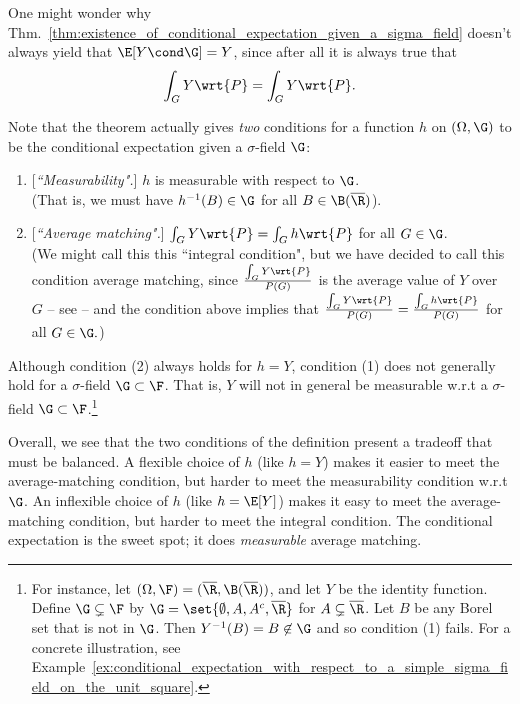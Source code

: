 \documentclass{article} %
\begin{document}
\begin{remark}
One might wonder why Thm.~\ref{thm:existence_of_conditional_expectation_given_a_sigma_field} doesn't always yield that $\E[Y \cond \G] = Y$, since after all it is always true that
\[  \int_G Y \wrt{P} = \int_G Y \wrt{P}.\]

Note that the theorem actually gives \textit{two} conditions for a function $h$ on $(\Omega, \G)$ to be the conditional expectation given a $\sigma$-field $\G$:
\begin{enumerate}
	\item {[}\textit{``Measurability".}]  $h$ is measurable with respect to $\G$.\\ 
	  
	 {\scriptsize (That is, we must have $h^{-1}(B) \in \G$ for all $B \in \B(\overline{\R})$).}
	\item {[}\textit{``Average matching".}] $\int_G Y \wrt{P} = \int_G h \wrt{P}$ for all $G \in \G$. \\
	
	{\scriptsize (We might call this this ``integral condition", but we have decided to call this condition average matching, since $\frac{\int_G Y \wrt{P}}{P(G)}$ is the average value of $Y$ over $G$ -- see  -- and the condition above implies that $\frac{\int_G Y \wrt{P}}{P(G)} = \frac{\int_G h \wrt{P}}{P(G)}$ for all $G \in \G.$)}
\end{enumerate}

Although condition (2) always holds for $h=Y$, condition (1) does not generally hold for a $\sigma$-field $\G \subset \F$. That is, $Y$ will not in general be measurable w.r.t a $\sigma$-field $\G \subset \F$.\footnote{For instance, let $(\Omega, \F) = (\overline{\R}, \B(\overline{\R}))$, and let $Y$ be the identity function.  Define $\G \subsetneq \F$ by $\G = \set{\emptyset, A, A^c, \overline{\R}}$ for $A \subsetneq \overline{\R}$.  Let $B$ be any Borel set that is not in $\G$.  Then $Y^{-1}(B) = B \not\in \G$ and so condition (1) fails.  For a concrete illustration, see Example~\ref{ex:conditional_expectation_with_respect_to_a_simple_sigma_field_on_the_unit_square}.}

Overall, we see that the two conditions of the definition present a tradeoff that must be balanced.  A flexible choice of $h$ (like $h=Y$) makes it easier to meet the average-matching condition, but harder to meet the measurability condition w.r.t $\G$.  An inflexible choice of $h$ (like $h=\E[Y]$) makes it easy to meet the average-matching condition, but harder to meet the integral condition.  The conditional expectation is the sweet spot; it does \textit{measurable} average matching. 
\label{rk:two_conditions_for_existence_of_conditional_expectation_with_respect_to_a_sigma_field} 
\end{remark}
\end{document}
